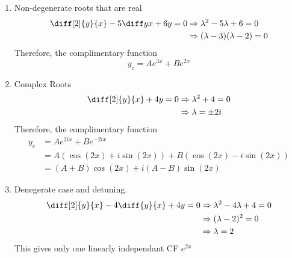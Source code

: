 \documentclass{article}
\begin{document}
\begin{eg}\leavevmode
    \begin{enumerate}
        \item Non-degenerate roots that are real
        \begin{align*}
            \diff[2]{y}{x} - 5 \diff yx + 6y = 0 &\Rightarrow \lambda^2 - 5 \lambda + 6 = 0 \\
            &\Rightarrow (\lambda - 3)(\lambda - 2) = 0
        \end{align*}
        Therefore, the complimentary function
        \[
            y_c = A e^{3x} + B e^{2x}  
        \]

        \item Complex Roots 
        \begin{align*}
            \diff[2]{y}{x} + 4y = 0 &\Rightarrow \lambda^2 + 4 = 0 \\
            &\Rightarrow \lambda = \pm 2i
        \end{align*}
        Therefore, the complimentary function 
        \begin{align*}
            y_c &= A e^{2ix} + B e^{-2ix} \\
            &= A (\cos(2x) + i \sin(2x)) + B(\cos(2x) - i\sin(2x)) \\
            &= (A + B) \cos (2x) + i (A - B) \sin (2x)
        \end{align*}

        \item Denegerate case and detuning.
        \begin{align*}
            \diff[2]{y}{x} - 4 \diff{y}{x} + 4y = 0 &\Rightarrow \lambda^2 - 4 \lambda + 4 = 0 \\
            &\Rightarrow (\lambda - 2)^2 = 0 \\
            &\Rightarrow \lambda = 2
        \end{align*}
        This gives only one linearly independant CF $e^{2x}$
    \end{enumerate}
\end{eg}
\end{document}
